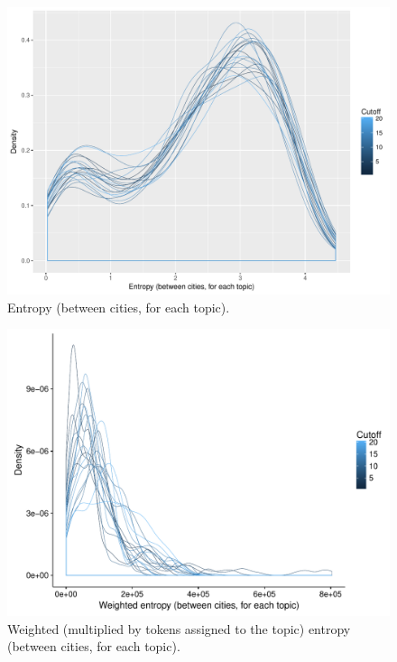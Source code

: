 \documentclass[11pt]{article}
\begin{document}
\begin{figure}[!ht]
	\centering %
	\caption{Entropy (between cities, for each topic).}
	\label{cutoffEntropy}
	\includegraphics[width=\linewidth]{figures/CutoffCityEntropy.pdf}
\end{figure}

\begin{figure}[!ht]
	\centering %
	\caption{Weighted (multiplied by tokens assigned to the topic) entropy (between cities, for each topic).}
	\label{cutoffEntropy}
	\includegraphics[width=\linewidth]{figures/CutoffCityEntropyWeighted.pdf}
\end{figure}
\end{document}
